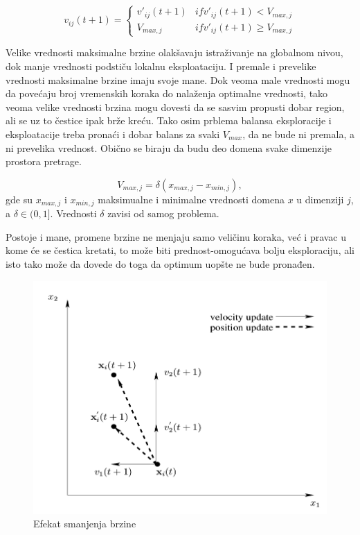 \documentclass[a4paper]{article}
\begin{document}
\begin{equation}
    v_{ij}(t+1) = \begin{cases}
                
            v'_{ij}(t+1)  & if  v'_{ij}(t+1) < V_{max,j}\\
            V_{max,j}  & if  v'_{ij}(t+1) \geq V_{max,j}
           
             \end{cases}
\end{equation}

Velike vrednosti maksimalne brzine olakšavaju istraživanje na globalnom nivou, dok manje vrednosti podstiču lokalnu eksploataciju. I premale i prevelike vrednosti maksimalne brzine imaju svoje mane. Dok veoma male vrednosti mogu da povećaju broj vremenskih koraka do nalaženja optimalne vrednosti, tako veoma velike vrednosti brzina mogu dovesti da se sasvim propusti dobar region, ali se uz to čestice ipak brže kreću. 
Tako osim prblema balansa eksploracije i eksploatacije treba pronaći i dobar balans za svaki $V_{max}$, da ne bude ni premala, a ni prevelika vrednost. Obično se biraju da budu deo domena svake dimenzije prostora pretrage. 

\[V_{max,j} = \delta(x_{max,j} − x_{min,j} ),\]
gde su $x_{max,j}$ i $x_{min,j}$ maksimualne i minimalne vrednosti domena $x$ u dimenziji $j$, a $\delta \in (0, 1]$.
Vrednosti $\delta$ zavisi od samog problema.

Postoje i mane, promene brzine ne menjaju samo veličinu koraka, već i pravac u kome će se čestica kretati, to može biti prednost-omogućava bolju eksploraciju, ali isto tako može da dovede do toga da optimum uopšte ne bude pronađen.

\begin{figure}[htp]
    \centering
    \includegraphics[scale=0.3]{slika3_1.png}
    \caption{Efekat smanjenja brzine}
    \label{fig:smanjenje_brzina}
\end{figure}
\end{document}

